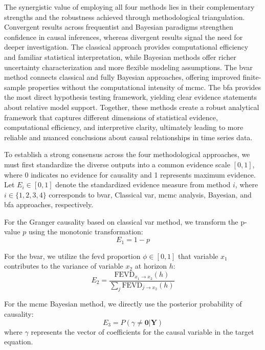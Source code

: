 \documentclass[preprint, 3p,
authoryear]{elsarticle} %
\begin{document}
The synergistic value of employing all four methods lies in their
complementary strengths and the robustness achieved through
methodological triangulation. Convergent results across frequentist and
Bayesian paradigms strengthen confidence in causal inferences, whereas
divergent results signal the need for deeper investigation. The
classical approach provides computational efficiency and familiar
statistical interpretation, while Bayesian methods offer richer
uncertainty characterization and more flexible modeling assumptions. The
\gls{bvar} method connects classical and fully Bayesian approaches,
offering improved finite-sample properties without the computational
intensity of \gls{mcmc}. The \gls{bfa} provides the most direct
hypothesis testing framework, yielding clear evidence statements about
relative model support. Together, these methods create a robust
analytical framework that captures different dimensions of statistical
evidence, computational efficiency, and interpretive clarity, ultimately
leading to more reliable and nuanced conclusions about causal
relationships in time series data.

To establish a strong consensus across the four methodological
approaches, we must first standardize the diverse outputs into a common
evidence scale \([0,1]\), where 0 indicates no evidence for causality
and 1 represents maximum evidence. Let \(E_i \in [0,1]\) denote the
standardized evidence measure from method \(i\), where
\(i \in \{1,2,3,4\}\) corresponds to \gls{bvar}, Classical \gls{var},
\gls{mcmc} analysis, Bayesian, and \gls{bfa} approaches, respectively.

For the Granger causality based on classical \gls{var} method, we
transform the p-value \(p\) using the monotonic transformation:
\begin{equation}
E_1 = 1 - p
\end{equation}

For the \gls{bvar}, we utilize the \gls{fevd} proportion
\(\phi \in [0,1]\) that variable \(x_1\) contributes to the variance of
variable \(x_2\) at horizon \(h\): \begin{equation}
E_2 = \frac{\text{FEVD}_{x_1 \rightarrow x_2}(h)}{\sum_{j} \text{FEVD}_{j \rightarrow x_2}(h)}
\end{equation}

For the \gls{mcmc} Bayesian method, we directly use the posterior
probability of causality: \begin{equation}
E_3 = P(\gamma \neq \mathbf{0} | \mathbf{Y})
\end{equation} where \(\gamma\) represents the vector of coefficients
for the causal variable in the target equation.
\end{document}
